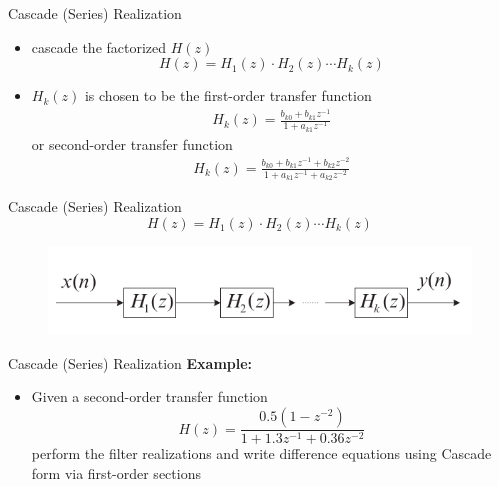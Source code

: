 \documentclass[pdflatex,compress,mathserif]{beamer}
\begin{document}
\begin{frame}{Cascade (Series) Realization}
  \begin{itemize}
    \item cascade the factorized $H(z)$
    \begin{equation*}
      H(z) = H_1(z) \cdot H_2(z) \cdots H_k(z)
    \end{equation*}
    \item $H_k(z)$ is chosen to be the first-order transfer function
    \begin{align*}
      H_k(z) = \frac{b_{k0} + b_{k1}z^{-1}}{1 + a_{k1}z^{-1}}
    \end{align*}
    or second-order transfer function
    \begin{align*}
      H_k(z) = \frac{b_{k0} + b_{k1}z^{-1} + b_{k2}z^{-2}}{1 + a_{k1}z^{-1} + a_{k2}z^{-2}}
    \end{align*}
  \end{itemize}
\end{frame}

\begin{frame}{Cascade (Series) Realization}
  \begin{equation*}
    H(z) = H_1(z) \cdot H_2(z) \cdots H_k(z)
  \end{equation*}
  \begin{figure}
    \centering
    \includegraphics[width=0.8\linewidth]{./img/img05.png}
  \end{figure}
\end{frame}

\begin{frame}{Cascade (Series) Realization}
  \textbf{Example:}
  \begin{itemize}
    \item Given a second-order transfer function $$ H(z) = \frac{0.5(1-z^{-2})}{1 + 1.3z^{-1} + 0.36 z^{-2}} $$ perform the filter realizations and write difference equations using Cascade form via first-order sections
  \end{itemize}
\end{frame}
\end{document}

